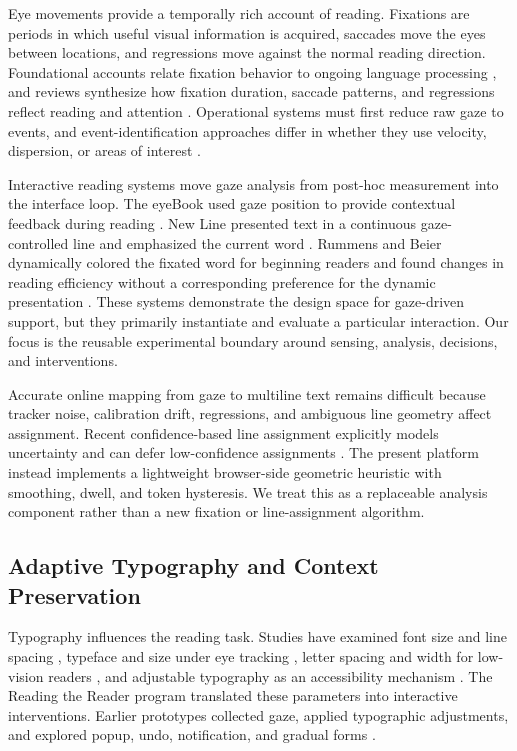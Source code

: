 \documentclass[sigconf,review,anonymous]{acmart}
\begin{document}
Eye movements provide a temporally rich account of reading.
Fixations are periods in which useful visual information is acquired, saccades move the eyes between locations, and regressions move against the normal reading direction.
Foundational accounts relate fixation behavior to ongoing language processing \cite{just1980reading}, and reviews synthesize how fixation duration, saccade patterns, and regressions reflect reading and attention \cite{rayner1998eyemovements,rayner2009eyemovements}.
Operational systems must first reduce raw gaze to events, and event-identification approaches differ in whether they use velocity, dispersion, or areas of interest \cite{salvucci2000identifying}.

Interactive reading systems move gaze analysis from post-hoc measurement into the interface loop.
The eyeBook used gaze position to provide contextual feedback during reading \cite{biedert2010eyebook}.
New Line presented text in a continuous gaze-controlled line and emphasized the current word \cite{medan2024newline}.
Rummens and Beier dynamically colored the fixated word for beginning readers and found changes in reading efficiency without a corresponding preference for the dynamic presentation \cite{rummens2025highlighting}.
These systems demonstrate the design space for gaze-driven support, but they primarily instantiate and evaluate a particular interaction.
Our focus is the reusable experimental boundary around sensing, analysis, decisions, and interventions.

Accurate online mapping from gaze to multiline text remains difficult because tracker noise, calibration drift, regressions, and ambiguous line geometry affect assignment.
Recent confidence-based line assignment explicitly models uncertainty and can defer low-confidence assignments \cite{kaltenberger2026confla}.
The present platform instead implements a lightweight browser-side geometric heuristic with smoothing, dwell, and token hysteresis.
We treat this as a replaceable analysis component rather than a new fixation or line-assignment algorithm.

\subsection{Adaptive Typography and Context Preservation}

Typography influences the reading task.
Studies have examined font size and line spacing \cite{rello2016makeitbig}, typeface and size under eye tracking \cite{beymer2008eyetracking}, letter spacing and width for low-vision readers \cite{beier2021letterspacing}, and adjustable typography as an accessibility mechanism \cite{arditi2004adjustable}.
The Reading the Reader program translated these parameters into interactive interventions.
Earlier prototypes collected gaze, applied typographic adjustments, and explored popup, undo, notification, and gradual forms \cite{refsgaard2024rtr,pereira2024typography,palinec2024reactive}.
\end{document}
